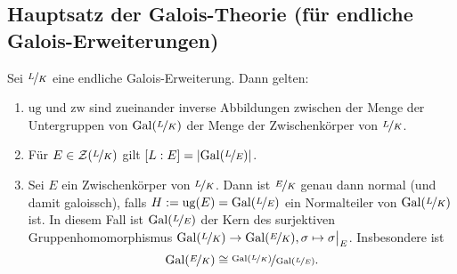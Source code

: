 \subsection{Hauptsatz der Galois-Theorie (für endliche Galois-Erweiterungen)} %
\label{sub:178}
Sei $\nicefrac{L}{K}$ eine endliche Galois-Erweiterung. Dann gelten: 
\begin{enumerate}[(1)]
	\item $\mathrm{ug}$ und $\mathrm{zw}$ sind zueinander inverse Abbildungen zwischen der Menge der Untergruppen von $\operatorname{Gal}(\nicefrac{L}{K})$ der Menge der Zwischenkörper
	von $\nicefrac{L}{K}$.
	\item Für $E \in \mathcal{Z}(\nicefrac{L}{K})$ gilt $[L:E]= \lvert\operatorname{Gal}(\nicefrac{L}{E})\rvert$.
	\item Sei $E$ ein Zwischenkörper von $\nicefrac{L}{K}$. Dann ist $\nicefrac{E}{K}$ genau dann normal (und damit galoissch), falls 
	$H:=\mathrm{ug}(E)= \operatorname{Gal}(\nicefrac{L}{E})$ ein Normalteiler von $\operatorname{Gal}(\nicefrac{L}{K})$ ist. In diesem Fall ist $\operatorname{Gal}(\nicefrac{L}{E})$ der Kern des surjektiven
	Gruppenhomomorphismus $\operatorname{Gal}(\nicefrac{L}{K}) \to \operatorname{Gal}(\nicefrac{E}{K}), \sigma \mapsto \sigma\big|_E$. Insbesondere ist 
	\[
		\operatorname{Gal}(\nicefrac{E}{K}) \cong \nicefrac{\operatorname{Gal}(\nicefrac{L}{K})}{\operatorname{Gal}(\nicefrac{L}{E})}.
	\]
\end{enumerate}
